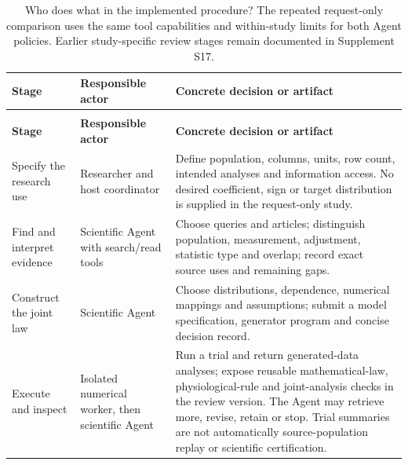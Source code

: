 \documentclass[11pt,letterpaper]{article}
\begin{document}
\FloatBarrier

\begingroup

\small

\renewcommand{\arraystretch}{1.22}

\begin{xltabular}{\linewidth}{@{}>{\raggedright\arraybackslash}X>{\raggedright\arraybackslash}X>{\raggedright\arraybackslash}X@{}}

\caption{Who does what in the implemented procedure? The repeated request-only comparison uses the same tool capabilities and within-study limits for both Agent policies. Earlier study-specific review stages remain documented in Supplement S17.}\label{tab:1} \\

\toprule

\textbf{Stage} & \textbf{Responsible actor} & \textbf{Concrete decision or artifact} \\

\midrule

\endfirsthead

\\

\toprule

\textbf{Stage} & \textbf{Responsible actor} & \textbf{Concrete decision or artifact} \\

\midrule

\endhead

\bottomrule

\endfoot

Specify the research use & Researcher and host coordinator & Define population, columns, units, row count, intended analyses and information access. No desired coefficient, sign or target distribution is supplied in the request-only study. \\

Find and interpret evidence & Scientific Agent with search/\allowbreak{}read tools & Choose queries and articles; distinguish population, measurement, adjustment, statistic type and overlap; record exact source uses and remaining gaps. \\

Construct the joint law & Scientific Agent & Choose distributions, dependence, numerical mappings and assumptions; submit a model specification, generator program and concise decision record. \\

Execute and inspect & Isolated numerical worker, then scientific Agent & Run a trial and return generated-data analyses; expose reusable mathematical-law, physiological-rule and joint-analysis checks in the review version. The Agent may retrieve more, revise, retain or stop. Trial summaries are not automatically source-population replay or scientific certification. \\


\end{xltabular}
\end{document}
